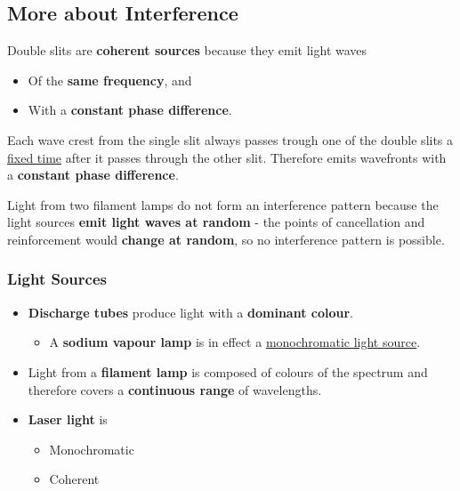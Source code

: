 \subsection{More about Interference}

Double slits are \textbf{coherent sources} because they emit light waves
\begin{itemize}
    \item Of the \textbf{same frequency}, and
    \item With a \textbf{constant phase difference}.
\end{itemize}
Each wave crest from the single slit always passes trough one of the double slits a \underline{fixed time} after it passes through the other slit. Therefore emits wavefronts with a \textbf{constant phase difference}.

Light from two filament lamps do not form an interference pattern because the light sources \textbf{emit light waves at random} - the points of cancellation and reinforcement would \textbf{change at random}, so no interference pattern is possible.

\subsubsection*{Light Sources}
\begin{itemize}
    \item \textbf{Discharge tubes} produce light with a \textbf{dominant colour}.
        \begin{itemize}
            \item A \textbf{sodium vapour lamp} is in effect a \underline{monochromatic light source}.
        \end{itemize}
    \item Light from a \textbf{filament lamp} is composed of colours of the spectrum and therefore covers a \textbf{continuous range} of wavelengths.

    \item \textbf{Laser light} is
        \begin{itemize}
            \item Monochromatic
            \item Coherent
        \end{itemize}
\end{itemize}

